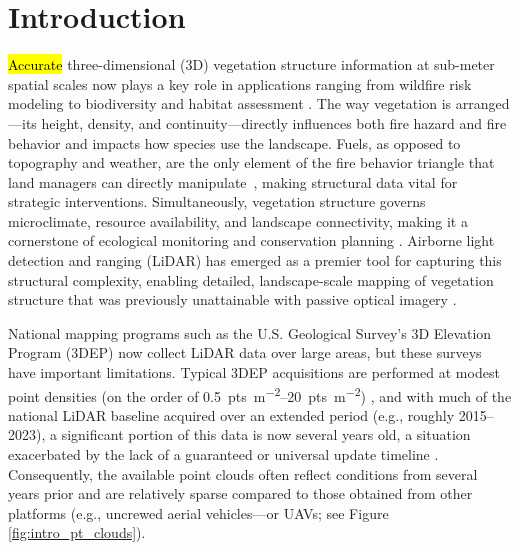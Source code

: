 \documentclass[remotesensing,article,accept,pdftex,moreauthors]{Definitions/mdpi}
\begin{document}



\section{Introduction}

\hl{Accurate} %
 three-dimensional (3D) vegetation structure information at sub-meter spatial scales now plays a key role in applications ranging from wildfire risk modeling \cite{martin-ducup_unlocking_2025} to biodiversity and habitat assessment \cite{Merrick2013Into3D,moudry2023vegetation}. The way vegetation is arranged—its height, density, and continuity—directly influences both fire hazard and fire behavior and impacts how species use the landscape. Fuels, as opposed to topography and weather, are the only element of the fire behavior triangle that land managers can directly \mbox{manipulate \cite{agee_influence_1996}}, making structural data vital for strategic interventions. Simultaneously, vegetation structure governs microclimate, resource availability, and landscape connectivity, making it a cornerstone of ecological monitoring and conservation planning \cite{guo2018integrating, mahata2023microclimate,ustin2021current}. Airborne light detection and ranging (LiDAR) has emerged as a premier tool for capturing this structural complexity, enabling detailed, landscape-scale mapping of vegetation structure that was previously unattainable with passive optical imagery \cite{Merrick2013Into3D, belov2019capabilities, guo2020lidar}. 

National mapping programs such as the U.S. Geological Survey's 3D Elevation Program (3DEP) now collect LiDAR data over large areas, but these surveys have important limitations. Typical 3DEP acquisitions are performed at modest point densities (on the order of \qtyrange{0.5}{20}{pts\per\square\meter}) \cite{wu2016evaluating}, and with much of the national LiDAR baseline acquired over an extended period (e.g., roughly 2015--2023), a significant portion of this data is now several years old, a situation exacerbated by the lack of a guaranteed or universal update timeline \cite{usgs_what_2019}. Consequently, the available point clouds often reflect conditions from several years prior and are relatively sparse compared to those obtained from other platforms (e.g., uncrewed aerial vehicles---or UAVs; see Figure \ref{fig:intro_pt_clouds}).
\end{document}
